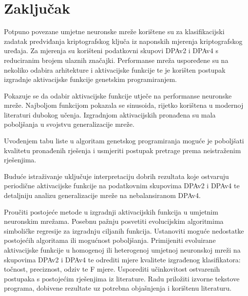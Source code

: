 \documentclass[times, utf8, numeric, diplomski]{fer}
\begin{document}
\chapter{Zaključak}
Potpuno povezane umjetne neuronske mreže korištene su za klasifikacijski zadatak predviđanja kriptografskog ključa iz naponskih mjerenja kriptografskog uređaja. Za mjerenja su korišteni podatkovni skupovi DPAv2 i DPAv4 s reduciranim brojem ulaznih značajki. Performanse mreža uspoređene su na nekoliko odabira arhitekture i aktivacijske funkcije te je korišten postupak izgradnje aktivacijske funkcije genetskim programiranjem.

Pokazuje se da odabir aktivacijske funkcije utječe na performanse neuronske mreže. Najboljom funkcijom pokazala se sinusoida, rijetko korištena u modernoj literaturi dubokog učenja. Izgradnjom aktivacijskih pronađena su mala poboljšanja u svojstvu generalizacije mreže.

Uvođenjem tabu liste u algoritam genetskog programiranja moguće je poboljšati kvalitetu pronađenih rješenja i usmjeriti postupak pretrage prema neistraženim rješenjima.

Buduće istraživanje uključuje interpretaciju dobrih rezultata koje ostvaruju periodične aktivacijske funkcije na podatkovnim skupovima DPAv2 i DPAv4 te detaljniju analizu generalizacije mreže na nebalansiranom DPAv4.




\begin{sazetak}
Proučiti postojeće metode u izgradnji aktivacijskih funkcija u umjetnim neuronskim mrežama. Posebnu pažnju posvetiti evolucijskim algoritmima simboličke regresije za izgradnju ciljanih funkcija. Ustanoviti moguće nedostatke postojećih algoritama ili mogućnost poboljšanja. Primijeniti evoluirane aktivacijske funkcije u homogenoj ili heterogenoj umjetnoj neuronskoj mreži na skupovima DPAv2 i DPAv4 te odrediti mjere kvalitete izgrađenog klasifikatora: točnost, preciznost, odziv te F mjere. Usporediti učinkovitost ostvarenih postupaka s postojećim rješenjima iz literature. Radu priložiti izvorne tekstove programa, dobivene rezultate uz potrebna objašnjenja i korištenu literaturu.

\end{sazetak}
\end{document}
